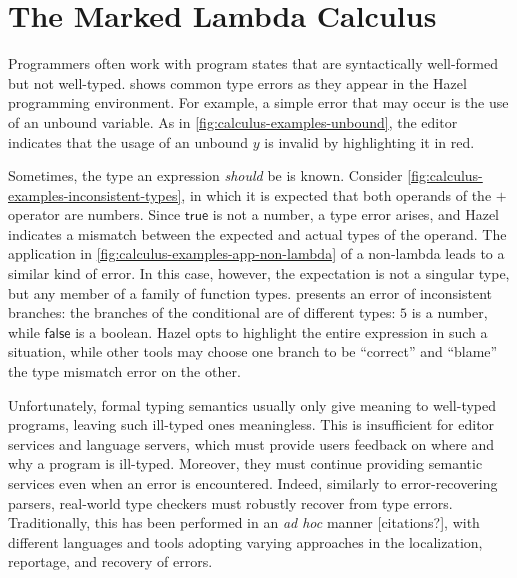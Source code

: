 
\section{The Marked Lambda Calculus}
\label{sec:calculus}

Programmers often work with program states that are syntactically well-formed but not well-typed.
 shows common type errors as they appear in the Hazel programming
environment. For example, a simple error that may occur is the use of an unbound variable. As in
\cref{fig:calculus-examples-unbound}, the editor indicates that the usage of an unbound $y$ is
invalid by highlighting it in red.



Sometimes, the type an expression \emph{should} be is known. Consider
\cref{fig:calculus-examples-inconsistent-types}, in which it is expected that both operands of the
$+$ operator are numbers. Since $\textsf{true}$ is not a number, a type error arises, and Hazel
indicates a mismatch between the expected and actual types of the operand. The application in
\cref{fig:calculus-examples-app-non-lambda} of a non-lambda leads to a similar kind of error. In
this case, however, the expectation is not a singular type, but any member of a family of function
types.  presents an error of inconsistent
branches: the branches of the conditional are of different types: $5$ is a number, while
$\textsf{false}$ is a boolean. Hazel opts to highlight the entire expression in such a situation,
while other tools may choose one branch to be ``correct'' and ``blame'' the type mismatch error on
the other.


Unfortunately, formal typing semantics usually only give meaning to well-typed programs, leaving
such ill-typed ones meaningless. This is insufficient for editor services and language servers,
which must provide users feedback on where and why a program is ill-typed. Moreover, they must
continue providing semantic services even when an error is encountered. Indeed, similarly to
error-recovering parsers, real-world type checkers must robustly recover from type errors.
Traditionally, this has been performed in an \emph{ad hoc} manner [citations?], with different
languages and tools adopting varying approaches in the localization, reportage, and recovery of
errors.

